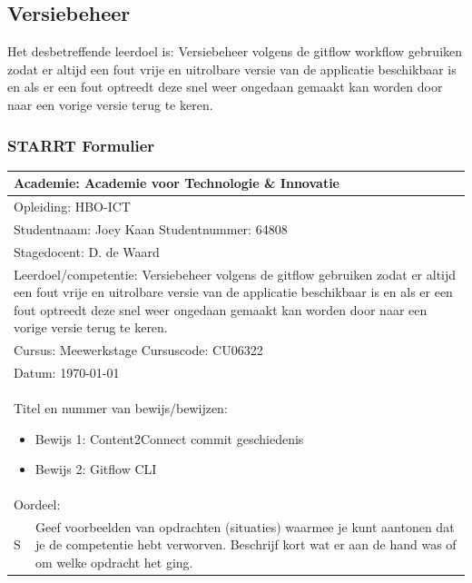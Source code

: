 \clearpage

\subsection{Versiebeheer}
Het desbetreffende leerdoel is: Versiebeheer volgens de \gls{gitflow} workflow gebruiken zodat er altijd een fout vrije en uitrolbare versie van de applicatie beschikbaar is en als er een fout optreedt deze snel weer ongedaan gemaakt kan worden door naar een vorige versie terug te keren.

\subsubsection{STARRT Formulier}
\begin{tabularx}{\textwidth}{| l | X |}
\hline
\multicolumn{2}{|l|}{Academie: Academie voor Technologie \& Innovatie } \\
\hline
\multicolumn{2}{|l|}{Opleiding: HBO-ICT } \\
\hline
\multicolumn{2}{|l|}{Studentnaam: Joey Kaan \hspace{35pt} Studentnummer: 64808} \\
\hline
\multicolumn{2}{|l|}{Stagedocent: D. de Waard} \\
\hline
\multicolumn{2}{|p{\textwidth-1in}|}{Leerdoel/competentie: Versiebeheer volgens de \gls{gitflow} gebruiken zodat er
altijd een fout vrije en uitrolbare versie van de applicatie beschikbaar is en als
er een fout optreedt deze snel weer ongedaan gemaakt kan worden door naar
een vorige versie terug te keren.} \\
\hline
\multicolumn{2}{|l|}{Cursus: Meewerkstage \hspace{35pt} Cursuscode: CU06322} \\
\hline
\multicolumn{2}{|l|}{Datum: \today} \\
\hline
\multicolumn{2}{|l|}{
\begin{minipage}{0.9\columnwidth}
Titel en nummer van bewijs/bewijzen:
\begin{itemize}
\item Bewijs 1: Content2Connect commit geschiedenis
\item Bewijs 2: Gitflow CLI
\end{itemize}
\end{minipage}
} \\ [50pt]
\hline
\multicolumn{2}{|l|}{Oordeel: } \\
\hline
S & Geef voorbeelden van opdrachten (situaties) waarmee je kunt aantonen dat je de competentie hebt verworven. Beschrijf kort wat er aan de hand was of om welke opdracht het ging.

\end{tabularx}
